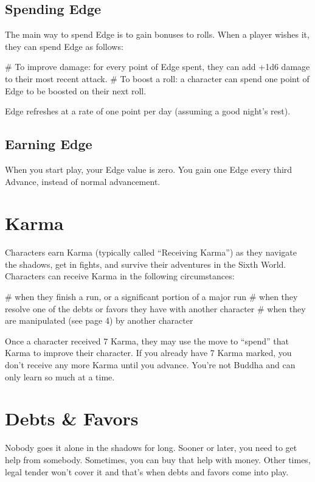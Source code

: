 \subsection{Spending Edge}
The main way to spend Edge is to gain bonuses to rolls. When a player wishes it, they can spend Edge as follows:

\begin{easylist}
    # To improve damage: for every point of Edge spent, they can add +1d6 damage to their most recent attack.
    # To boost a roll: a character can spend one point of Edge to be boosted on their next roll.    
\end{easylist}

Edge refreshes at a rate of one point per day (assuming a good night’s rest).

\subsection{Earning Edge}
When you start play, your Edge value is zero. You gain one Edge every third Advance, instead of normal advancement.


\section{Karma}

Characters earn Karma (typically called ``Receiving Karma'') as they navigate the shadows, get in fights, and survive their adventures in the Sixth World. Characters can receive Karma in the following circumstances:

\begin{easylist}
# when they finish a run, or a significant portion of a major run
# when they resolve one of the debts or favors they have with another character
# when they are manipulated (see page 4) by another character
\end{easylist}

Once a character received 7 Karma, they may use the  move to ``spend'' that Karma to improve their character. If you already have 7 Karma marked, you don’t receive any more Karma until you advance. You're not Buddha and can only learn so much at a time.


\section{Debts \& Favors}

Nobody goes it alone in the shadows for long. Sooner or later, you need to get help from somebody. Sometimes, you can buy that help with money. Other times, legal tender won’t cover it and that’s when debts and favors come into play.

